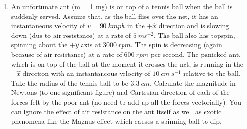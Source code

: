 \documentclass[fleqn]{article}
\begin{document}
\begin{enumerate}
    \item An unfortunate ant (m = 1 mg) is on top of a tennis ball when the ball is suddenly served. Assume that, as the ball flies over the net,
    it has an instantaneous velocity of $v=90 ~ kmph$ in the $+\hat{x}$ direction and is slowing down (due to air resistance) at a rate of
    $5 ~ ms^{-2}$. The ball also has topspin, spinning about the $+\hat{y}$ axis at $3000 ~ rpm$. The spin is decreasing (again because of air resistance) at a rate of
    $600 ~ rpm$ per second. The panicked ant, which is on top of the ball at the moment it crosses the net, is running in the $-\hat{x}$ direction with an
    instantaneous velocity of $10 ~ cm ~ s^{-1}$ relative to the ball. Take the radius of the tennis ball to be $3.3 ~ cm$. Calculate the magnitude in Newtons
    (to one significant figure) and Cartesian direction of each of the forces felt by the poor ant (no need to add up all the forces vectorially). You
    can ignore the effect of air resistance on the ant itself as well as exotic phenomena like the Magnus effect which causes a spinning ball to dip.


\end{enumerate}
\end{document}
